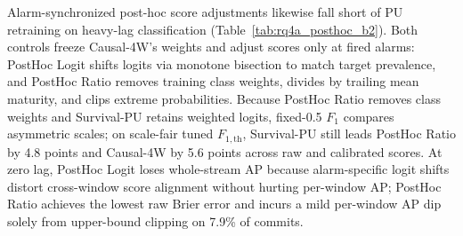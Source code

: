 \documentclass[pdflatex,sn-basic]{sn-jnl}
\theoremstyle{definition}
\theoremstyle{plain}
\begin{document}
Alarm-synchronized post-hoc score adjustments likewise fall short of PU retraining on heavy-lag classification (Table~\ref{tab:rq4a_posthoc_b2}). Both controls freeze Causal-4W's weights and adjust scores only at fired alarms: PostHoc Logit shifts logits via monotone bisection to match target prevalence, and PostHoc Ratio removes training class weights, divides by trailing mean maturity, and clips extreme probabilities. Because PostHoc Ratio removes class weights and Survival-PU retains weighted logits, fixed-0.5 $F_1$ compares asymmetric scales; on scale-fair tuned $F_{1,\text{th}}$, Survival-PU still leads PostHoc Ratio by 4.8 points and Causal-4W by 5.6 points across raw and calibrated scores. At zero lag, PostHoc Logit loses whole-stream AP because alarm-specific logit shifts distort cross-window score alignment without hurting per-window AP; PostHoc Ratio achieves the lowest raw Brier error and incurs a mild per-window AP dip solely from upper-bound clipping on 7.9\% of commits.
\end{document}
